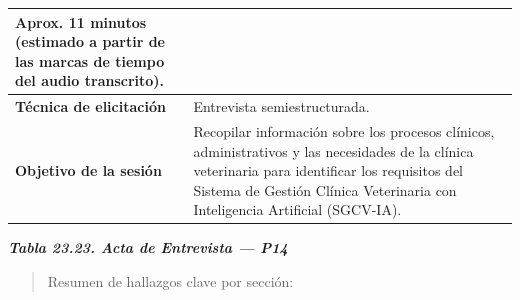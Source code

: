 \documentclass[
]{article}
\begin{document}
{\begin{longtable}[]{|
  >{\raggedright\arraybackslash}p{}|
  >{\raggedright\arraybackslash}p{}|}
\begin{minipage}[t]{\linewidth}
Aprox. 11 minutos (estimado a partir de las marcas de tiempo del audio transcrito).
\end{minipage} \\
\hline
\textbf{Técnica de elicitación} & \begin{minipage}[t]{\linewidth}\raggedright
Entrevista semiestructurada.
\end{minipage} \\
\hline
\textbf{Objetivo de la sesión} & \begin{minipage}[t]{\linewidth}\raggedright
Recopilar información sobre los procesos clínicos, administrativos y las necesidades de la clínica veterinaria para identificar los requisitos del Sistema de Gestión Clínica Veterinaria con Inteligencia Artificial (SGCV-IA).
\end{minipage} \\
\hline
\end{longtable}
}

\protect{}\label{_bookmark_P14_acta}{}\emph{\textbf{Tabla 23.23. Acta de Entrevista --- P14}}

\begin{quote}
Resumen de hallazgos clave por sección:
\end{quote}
\end{document}

